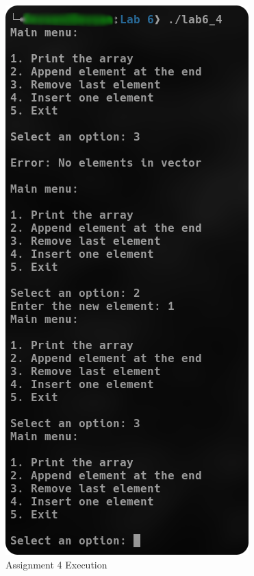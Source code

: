 \documentclass[
	letterpaper, %
	10pt, %
]{CSUniSchoolLabReport}
\begin{document}
  \begin{figure}[H]
    \centering
    \includegraphics[height=.9\textheight]{Figures/6_4.png}
    \caption{Assignment 4 Execution}
    \label{fig:6}
  \end{figure}
\end{document}
